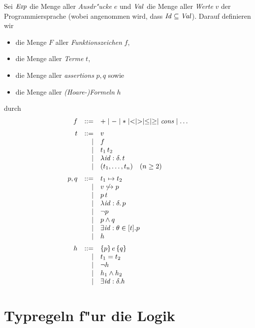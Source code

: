 \documentclass[12pt,a4paper,bigheadings]{scrartcl}
\renewcommand{\disjoint}[2]{\ensuremath{#2\not\hookrightarrow#1}}
\begin{document}
Sei ${\text{\it Exp\/}}$ die Menge aller {\em Ausdr"ucke} $e$ und ${\text{\it Val\/}}$ die Menge aller {\em Werte} $v$
der Programmiersprache (wobei angenommen wird, dass ${\text{\it Id\/}} \subseteq {\text{\it Val\/}}$). Darauf definieren wir 
\begin{itemize}
  \item die Menge $F$ aller {\em Funktionszeichen} $f$,
  \item die Menge  aller {\em Terme} $t$,
  \item die Menge  aller {\em assertions} $p,q$ sowie
  \item die Menge  aller {\em (Hoare-)Formeln} $h$
\end{itemize}
durch
\[\bgram
f \is + \mid - \mid * \mid < \mid > \mid \le \mid \ge \mid \Cons \mid \ldots
  \n
t \is v
  \al f
  \al \app{t_1}{t_2}
  \al \abstr{\id:\delta}{t}
  \al (t_1,\ldots,t_n)  \quad (n \ge 2)
  \n
p,q \is t_1 \mapsto t_2
    \al \disjoint{p}{v}
    \al \app{p}{t}
    \al \abstr{\id:\delta}{p}
    \al \neg p
    \al p \wedge q
    \al \exists \id:\theta\in[t]. p
    \al h
    \n
h \is \triple{p}{e}{q}
  \al t_1 = t_2
  \al \neg h
  \al h_1 \wedge h_2
  \al \exists \id:\delta. h
\egram\]


\section{Typregeln f"ur die Logik}
\end{document}
